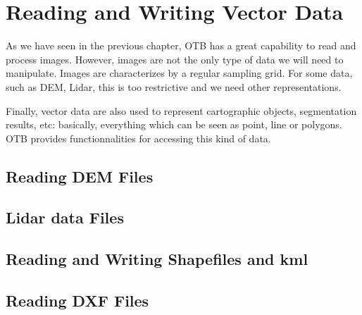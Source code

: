 \chapter{Reading and Writing Vector Data}
\label{sec:ReadingVectorData}

As we have seen in the previous chapter, OTB has a great capability to
read and process images. However, images are not the only type of data
we will need to manipulate. Images are characterizes by a regular sampling
grid. For some data, such as DEM, Lidar, this is too restrictive and we need
other representations.

Finally, vector data are also used to represent cartographic objects,
segmentation results, etc: basically, everything which can be seen as point,
line or polygons. OTB provides functionnalities for accessing this kind of data.

\section{Reading DEM Files}
\label{sec:ReadDEM}


\section{Lidar data Files}
\label{sec:ReadLidar}
%
%

\section{Reading and Writing Shapefiles and kml}
\label{sec:ReadVectorData}


\section{Reading DXF Files}
\label{sec:ReadDXF}

